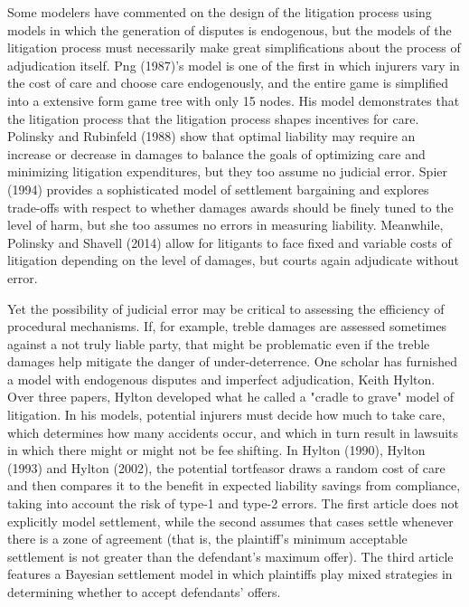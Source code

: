 \documentclass{article}
\begin{document}
Some modelers have commented on the design of the litigation process using models in which the generation of disputes is endogenous, but the models of the litigation process must necessarily make great simplifications about the process of adjudication itself. Png (1987)'s model is one of the first in which injurers vary in the cost of care and choose care endogenously, and the entire game is simplified into a extensive form game tree with only 15 nodes. His model demonstrates that the litigation process that the litigation process shapes incentives for care. Polinsky and Rubinfeld (1988) show that optimal liability may require an increase or decrease in damages to balance the goals of optimizing care and minimizing litigation expenditures, but they too assume no judicial error. Spier (1994) provides a sophisticated model of settlement bargaining and explores trade-offs with respect to whether damages awards should be finely tuned to the level of harm, but she too assumes no errors in measuring liability. Meanwhile, Polinsky and Shavell (2014) allow for litigants to face fixed and variable costs of litigation depending on the level of damages, but courts again adjudicate without error.

Yet the possibility of judicial error may be critical to assessing the efficiency of procedural mechanisms. If, for example, treble damages are assessed sometimes against a not truly liable party, that might be problematic even if the treble damages help mitigate the danger of under-deterrence. One scholar has furnished a model with endogenous disputes and imperfect adjudication, Keith Hylton. Over three papers, Hylton developed what he called a "cradle to grave" model of litigation. In his models, potential injurers must decide how much to take care, which determines how many accidents occur, and which in turn result in lawsuits in which there might or might not be fee shifting. In Hylton (1990), Hylton (1993) and Hylton (2002), the potential tortfeasor draws a random cost of care and then compares it to the benefit in expected liability savings from compliance, taking into account the risk of type-1 and type-2 errors. The first article does not explicitly model settlement, while the second assumes that cases settle whenever there is a zone of agreement (that is, the plaintiff's minimum acceptable settlement is not greater than the defendant's maximum offer). The third article features a Bayesian settlement model in which plaintiffs play mixed strategies in determining whether to accept defendants' offers.  
\end{document}
